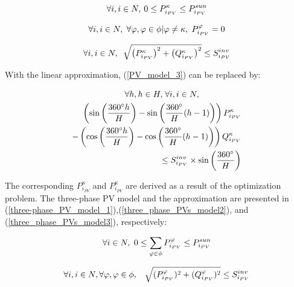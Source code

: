 \documentclass[journal]{IEEEtran}
\begin{document}
\begin{equation}\label{PV_model_1}
\forall i, i \in N, \hskip 2pt 0 \leq P_{i_{PV}}^{\kappa} \leq P_{i_{PV}}^{sun}
\end{equation}

\begin{equation}\label{PV_model_2}
\forall i, i \in N, \hskip 3pt \forall \varphi, \varphi \in \phi | \varphi \neq \kappa, \hskip 3pt P_{i_{PV}}^{\varphi}=0
\end{equation}

\begin{equation}\label{PV_model_3}
\forall i, i \in N, \hskip 5pt \sqrt{\left(P_{i_{PV}}^{\kappa}\right)^2 +\left(Q_{i_{PV}}^{\kappa}\right)^2} \leq S_{i_{PV}}^{inv}
\end{equation}

With the linear approximation, (\ref{PV_model_3}) can be replaced by:

\begin{equation}\label{linear_PV_model}
\begin{split}
\forall h, h \in H, \hskip 1pt \forall i, i \in N, \hskip 50pt \\ \left(\sin\left(\frac{360^\circ h}{H}\right)- \sin\left(\frac{360^\circ}{H}(h-1)\right)\right)P_{i_{PV}}^{\kappa} \\
-\left(\cos\left(\frac{360^\circ h}{H}\right)- \cos\left(\frac{360^\circ}{H}(h-1)\right)\right)Q_{i_{PV}}^{\kappa} \\ \leq S_{i_{PV}}^{inv} \times \sin\left(\frac{360^\circ}{H}\right)
\end{split}
\end{equation}

The corresponding $P_{i_{PV}}^{\kappa}$ and $P_{i_{PV}}^{\kappa}$ are derived as a result of the optimization problem. The three-phase PV model and the approximation are presented in (\ref{three-phase_PV_model_1}),(\ref{three_phase_PVs_model2}), and (\ref{three_phase_PVs_model3}), respectively:

\begin{equation}\label{three-phase_PV_model_1}
\forall i \in N, \hskip 3pt 
0 \leq \displaystyle\sum_{\varphi\in\phi} P_{i_{PV}}^{\varphi} \leq P_{i_{PV}}^{sun}
\end{equation}

\begin{equation}\label{three_phase_PVs_model2}
\forall i, i \in N, \forall \varphi, \varphi \in \phi, \hskip 0.7pc \sqrt{(P_{i_{PV}}^{\varphi})^2 +(Q_{i_{PV}}^{\varphi})^2} \leq S_{i_{PV}}^{inv}
\end{equation}
\end{document}
